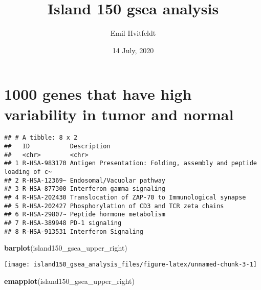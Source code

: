 \documentclass[
]{article}
\title{Island 150 gsea analysis}
\author{Emil Hvitfeldt}
\date{14 July, 2020}
\newenvironment{Shaded}{\begin{snugshade}}{\end{snugshade}}
\newcommand{\KeywordTok}[1]{\textcolor[rgb]{0.13,0.29,0.53}{\textbf{#1}}}
\newcommand{\NormalTok}[1]{#1}
\newcommand{\OperatorTok}[1]{\textcolor[rgb]{0.81,0.36,0.00}{\textbf{#1}}}
\newcommand{\StringTok}[1]{\textcolor[rgb]{0.31,0.60,0.02}{#1}}
\begin{document}
\maketitle

\hypertarget{genes-that-have-high-variability-in-tumor-and-normal}{%
\section{1000 genes that have high variability in tumor and
normal}\label{genes-that-have-high-variability-in-tumor-and-normal}}

\begin{Shaded}
\end{Shaded}

\begin{verbatim}
## # A tibble: 8 x 2
##   ID           Description                                                      
##   <chr>        <chr>                                                            
## 1 R-HSA-983170 Antigen Presentation: Folding, assembly and peptide loading of c~
## 2 R-HSA-12369~ Endosomal/Vacuolar pathway                                       
## 3 R-HSA-877300 Interferon gamma signaling                                       
## 4 R-HSA-202430 Translocation of ZAP-70 to Immunological synapse                 
## 5 R-HSA-202427 Phosphorylation of CD3 and TCR zeta chains                       
## 6 R-HSA-29807~ Peptide hormone metabolism                                       
## 7 R-HSA-389948 PD-1 signaling                                                   
## 8 R-HSA-913531 Interferon Signaling
\end{verbatim}

\begin{Shaded}
\begin{Highlighting}[]
\KeywordTok{barplot}\NormalTok{(island150_gsea_upper_right)}
\end{Highlighting}
\end{Shaded}

\texttt{[image: island150\_gsea\_analysis\_files/figure-latex/unnamed-chunk-3-1]}

\begin{Shaded}
\begin{Highlighting}[]
\KeywordTok{emapplot}\NormalTok{(island150_gsea_upper_right)}
\end{Highlighting}
\end{Shaded}
\end{document}
